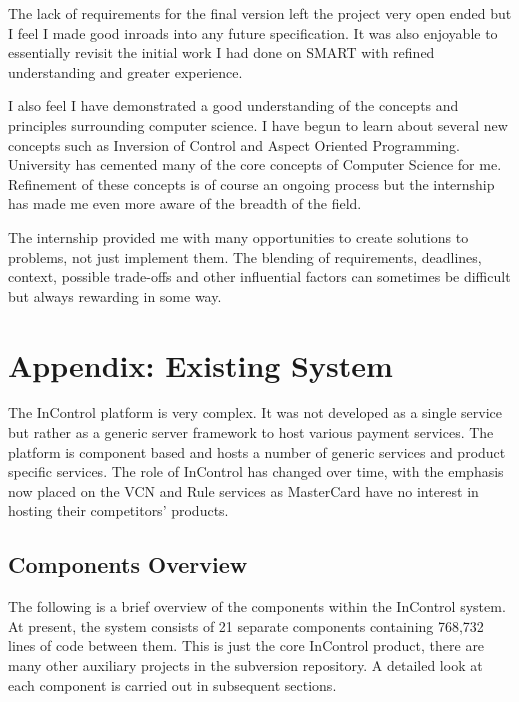 \documentclass[a4paper, 11pt, titlepage]{article}
\begin{document}
The lack of requirements for the final version left the project very open ended but I feel I made good inroads into any future specification. It was also enjoyable to essentially revisit the initial work I had done on SMART with refined understanding and greater experience.

I also feel I have demonstrated a good understanding of the concepts and principles surrounding computer science. I have begun to learn about several new concepts such as Inversion of Control and Aspect Oriented Programming. University has cemented many of the core concepts of Computer Science for me. Refinement of these concepts is of course an ongoing process but the internship has made me even more aware of the breadth of the field.

The internship provided me with many opportunities to create solutions to problems, not just implement them. The blending of requirements, deadlines, context, possible trade-offs and other influential factors can sometimes be difficult but always rewarding in some way.
 

\newpage

 
 
 
\newpage

\appendix
\section{Appendix: Existing System} 
 
The InControl platform is very complex. It was not developed as a single service but rather as a generic server framework to host various payment services. The platform is component based and hosts a number of generic services and product specific services. The role of InControl has changed over time, with the emphasis now placed on the VCN and Rule services as MasterCard have no interest in hosting their competitors’ products. 
 
\subsection{Components Overview} 
The following is a brief overview of the components within the InControl system. At present, the system consists of 21 separate components containing 768,732\cite{SLOC} lines of code between them. This is just the core InControl product, there are many other auxiliary projects in the subversion repository. A detailed look at each component is carried out in subsequent sections. 
 
\end{document}

